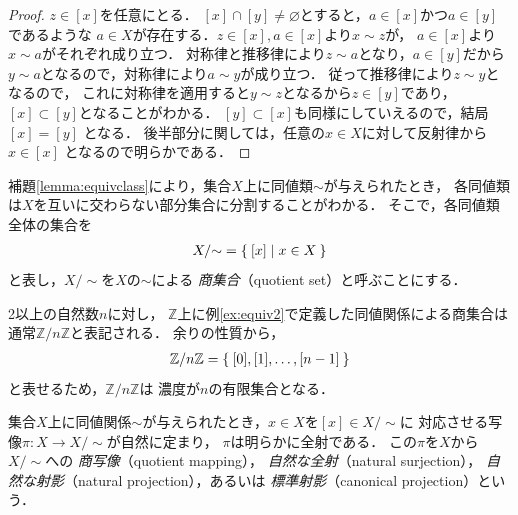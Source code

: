    \begin{proof}
     $z \in [x]$を任意にとる．
     $[x] \cap [y] \neq \varnothing$とすると，$a \in [x]$かつ$a \in [y]$であるような
     $a \in X$が存在する．$z \in [x], a \in [x]$より$x \sim z$が，
     $a \in [x]$より$x \sim a$がそれぞれ成り立つ．
     対称律と推移律により$z \sim a$となり，$a \in [y]$だから
     $y \sim a$となるので，対称律により$a \sim y$が成り立つ．
     従って推移律により$z \sim y$となるので，
     これに対称律を適用すると$y \sim z$となるから$z \in [y]$であり，
     $[x] \subset [y]$となることがわかる．
     $[y] \subset [x]$も同様にしていえるので，結局$[x] = [y]$
     となる．
     後半部分に関しては，任意の$x \in X$に対して反射律から$x \in [x]$
     となるので明らかである．
   \end{proof}

   補題\ref{lemma:equivclass}により，集合$X$上に同値類$\sim$が与えられたとき，
   各同値類は$X$を互いに交わらない部分集合に分割することがわかる．
   そこで，各同値類全体の集合を
   \begin{align}
     X / {\sim} = \Set{ [x] \mid x \in X }
     \label{eq:quoset}
   \end{align}
   と表し，$X/ { \sim}$を$X$の$\sim$による
   \emph{商集合}（quotient set）と呼ぶことにする．

   \begin{ex} \label{ex:quoset}
     2以上の自然数$n$に対し，
     $\mathbb{Z}$上に例\ref{ex:equiv2}で定義した同値関係による商集合は
     通常$\mathbb{Z}/{n \mathbb{Z} }$と表記される．
     余りの性質から，
     \begin{align*}
       \mathbb{Z} / { n \mathbb{Z} } = \Set{ [0] , [1] , \ldots , [n-1] }
     \end{align*}
     と表せるため，$\mathbb{Z} / { n \mathbb{Z} }$は
     濃度が$n$の有限集合となる．
   \end{ex}


   集合$X$上に同値関係$\sim$が与えられたとき，$x \in X$を$[x] \in X/{\sim}$に
   対応させる写像$\pi : X \longrightarrow X/{\sim}$が自然に定まり，
   $\pi$は明らかに全射である．
   この$\pi$を$X$から$X/{\sim}$への
   \emph{商写像}（quotient mapping），
   \emph{自然な全射}（natural surjection），
   \emph{自然な射影}（natural projection），あるいは
   \emph{標準射影}（canonical projection）という．

